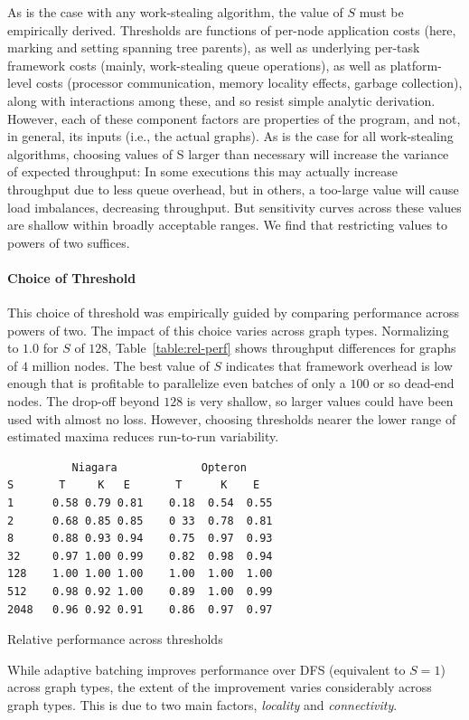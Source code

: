 As is the case with any work-stealing algorithm, the value of $S$ must
be empirically derived. Thresholds are functions of per-node
application costs (here, marking and setting spanning tree parents),
as well as underlying per-task framework costs (mainly, work-stealing
queue operations), as well as platform-level costs (processor
communication, memory locality effects, garbage collection), along
with interactions among these, and so resist simple analytic
derivation.  However, each of these component factors are properties
of the program, and not, in general, its inputs (i.e., the actual
graphs).  As is the case for all work-stealing algorithms, choosing
values of S larger than necessary will increase the variance of
expected throughput: In some executions this may actually increase
throughput due to less queue overhead, but in others, a too-large
value will cause load imbalances, decreasing throughput.  But
sensitivity curves across these values are shallow within broadly
acceptable ranges. We find that restricting values to powers of two
suffices.

\paragraph{Choice of Threshold}

This choice of threshold was empirically guided by comparing
performance across powers of two. The impact of this choice varies
across graph types. Normalizing to $1.0$ for $S$ of $128$,
Table~\ref{table:rel-perf} shows throughput differences for graphs of
$4$ million nodes.  The best value of $S$ indicates that \XWS{} framework
overhead is low enough that is profitable to parallelize even batches
of only a $100$ or so dead-end nodes. The drop-off beyond $128$ is
very shallow, so larger values could have been used with almost no
loss.  However, choosing thresholds nearer the lower range of
estimated maxima reduces run-to-run variability.

\begin{table}
{\footnotesize
\begin{verbatim}
          Niagara             Opteron
S       T     K   E       T      K    E
1      0.58 0.79 0.81    0.18  0.54  0.55
2      0.68 0.85 0.85    0 33  0.78  0.81
8      0.88 0.93 0.94    0.75  0.97  0.93
32     0.97 1.00 0.99    0.82  0.98  0.94
128    1.00 1.00 1.00    1.00  1.00  1.00
512    0.98 0.92 1.00    0.89  1.00  0.99
2048   0.96 0.92 0.91    0.86  0.97  0.97
\end{verbatim}}
\caption{Relative performance across thresholds}\label{table:rel-perf}
\end{table}
While adaptive batching improves performance over DFS (equivalent to
$S=1$) across graph types, the extent of the improvement varies
considerably across graph types. This is due to two main factors,
{\em locality} and {\em connectivity}.

